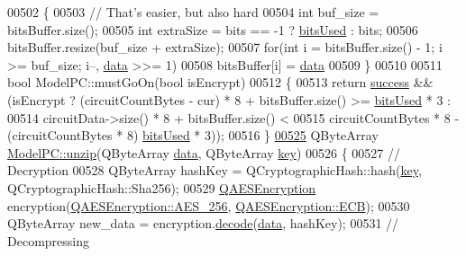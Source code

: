 \begin{DoxyCode}
00502 \{
00503     \textcolor{comment}{// That's easier, but also hard}
00504     \textcolor{keywordtype}{int} buf\_size = bitsBuffer.size();
00505     \textcolor{keywordtype}{int} extraSize = bits == -1 ? \mbox{\hyperlink{class_model_p_c_a655deb6a8afa94c7f4aadb3056989038}{bitsUsed}} : bits;
00506     bitsBuffer.resize(buf\_size + extraSize);
00507     \textcolor{keywordflow}{for}(\textcolor{keywordtype}{int} i = bitsBuffer.size() - 1; i >= buf\_size; i--, \mbox{\hyperlink{namespace_errors_dict_setup_af570460846fb9f0c91abd308a095dcdc}{data}} >>= 1)
00508         bitsBuffer[i] = \mbox{\hyperlink{namespace_errors_dict_setup_af570460846fb9f0c91abd308a095dcdc}{data}} %
00509 \}
00510 
00511 \textcolor{keywordtype}{bool} ModelPC::mustGoOn(\textcolor{keywordtype}{bool} isEncrypt)
00512 \{
00513     \textcolor{keywordflow}{return} \mbox{\hyperlink{class_model_p_c_a945ffbbc44a832b953c191debd448f4c}{success}} && (isEncrypt ? (circuitCountBytes - cur) * 8 + bitsBuffer.size() >= 
      \mbox{\hyperlink{class_model_p_c_a655deb6a8afa94c7f4aadb3056989038}{bitsUsed}} * 3 :
00514                                    circuitData->size() * 8 + bitsBuffer.size() <
00515                                    circuitCountBytes * 8 - (circuitCountBytes * 8)%
      \mbox{\hyperlink{class_model_p_c_a655deb6a8afa94c7f4aadb3056989038}{bitsUsed}} * 3));
00516 \}
\mbox{\hyperlink{class_model_p_c_a6da88f166785a49f73b22c169f956fd0}{00525}} QByteArray \mbox{\hyperlink{class_model_p_c_a6da88f166785a49f73b22c169f956fd0}{ModelPC::unzip}}(QByteArray \mbox{\hyperlink{namespace_errors_dict_setup_af570460846fb9f0c91abd308a095dcdc}{data}}, QByteArray \mbox{\hyperlink{namespace_errors_dict_setup_a09c268098d09ffb8e5504f30fa6d5dd9}{key}})
00526 \{
00527     \textcolor{comment}{// Decryption}
00528     QByteArray hashKey = QCryptographicHash::hash(\mbox{\hyperlink{namespace_errors_dict_setup_a09c268098d09ffb8e5504f30fa6d5dd9}{key}}, QCryptographicHash::Sha256);
00529     \mbox{\hyperlink{class_q_a_e_s_encryption}{QAESEncryption}} encryption(\mbox{\hyperlink{class_q_a_e_s_encryption_abe48208f4f6c7d68e6a10b49b9d0b7bdacde97774ab1d4c609e04b0dd13a1e1f7}{QAESEncryption::AES\_256}}, 
      \mbox{\hyperlink{class_q_a_e_s_encryption_ad3e031c49a3d56566379d75b40b7b255a4ca7f51778e2adf1f464164a0ba8e75e}{QAESEncryption::ECB}});
00530     QByteArray new\_data = encryption.\mbox{\hyperlink{class_q_a_e_s_encryption_a58f972f2b66c2454edd5112495463bba}{decode}}(\mbox{\hyperlink{namespace_errors_dict_setup_af570460846fb9f0c91abd308a095dcdc}{data}}, hashKey);
00531     \textcolor{comment}{// Decompressing}

\end{DoxyCode}
